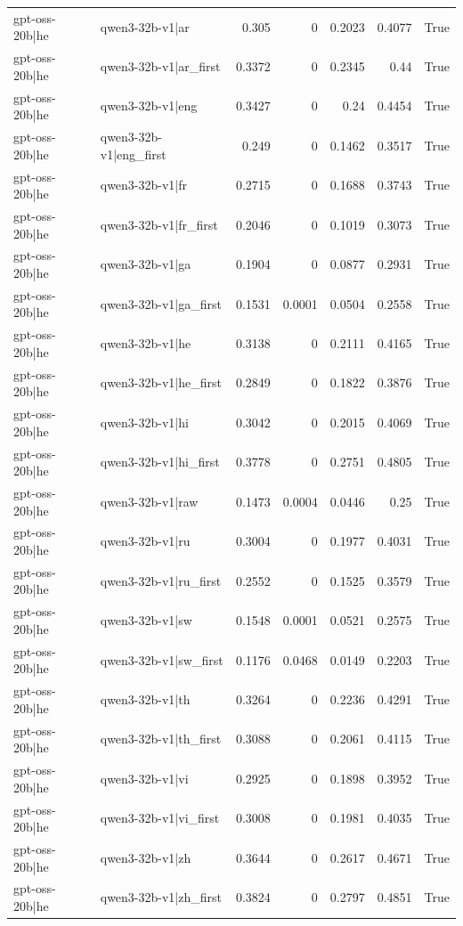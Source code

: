 \begin{table}
\begin{tabular}{l l r r r r l}
gpt-oss-20b|he & qwen3-32b-v1|ar & 0.305 & 0 & 0.2023 & 0.4077 & True \\
gpt-oss-20b|he & qwen3-32b-v1|ar_first & 0.3372 & 0 & 0.2345 & 0.44 & True \\
gpt-oss-20b|he & qwen3-32b-v1|eng & 0.3427 & 0 & 0.24 & 0.4454 & True \\
gpt-oss-20b|he & qwen3-32b-v1|eng_first & 0.249 & 0 & 0.1462 & 0.3517 & True \\
gpt-oss-20b|he & qwen3-32b-v1|fr & 0.2715 & 0 & 0.1688 & 0.3743 & True \\
gpt-oss-20b|he & qwen3-32b-v1|fr_first & 0.2046 & 0 & 0.1019 & 0.3073 & True \\
gpt-oss-20b|he & qwen3-32b-v1|ga & 0.1904 & 0 & 0.0877 & 0.2931 & True \\
gpt-oss-20b|he & qwen3-32b-v1|ga_first & 0.1531 & 0.0001 & 0.0504 & 0.2558 & True \\
gpt-oss-20b|he & qwen3-32b-v1|he & 0.3138 & 0 & 0.2111 & 0.4165 & True \\
gpt-oss-20b|he & qwen3-32b-v1|he_first & 0.2849 & 0 & 0.1822 & 0.3876 & True \\
gpt-oss-20b|he & qwen3-32b-v1|hi & 0.3042 & 0 & 0.2015 & 0.4069 & True \\
gpt-oss-20b|he & qwen3-32b-v1|hi_first & 0.3778 & 0 & 0.2751 & 0.4805 & True \\
gpt-oss-20b|he & qwen3-32b-v1|raw & 0.1473 & 0.0004 & 0.0446 & 0.25 & True \\
gpt-oss-20b|he & qwen3-32b-v1|ru & 0.3004 & 0 & 0.1977 & 0.4031 & True \\
gpt-oss-20b|he & qwen3-32b-v1|ru_first & 0.2552 & 0 & 0.1525 & 0.3579 & True \\
gpt-oss-20b|he & qwen3-32b-v1|sw & 0.1548 & 0.0001 & 0.0521 & 0.2575 & True \\
gpt-oss-20b|he & qwen3-32b-v1|sw_first & 0.1176 & 0.0468 & 0.0149 & 0.2203 & True \\
gpt-oss-20b|he & qwen3-32b-v1|th & 0.3264 & 0 & 0.2236 & 0.4291 & True \\
gpt-oss-20b|he & qwen3-32b-v1|th_first & 0.3088 & 0 & 0.2061 & 0.4115 & True \\
gpt-oss-20b|he & qwen3-32b-v1|vi & 0.2925 & 0 & 0.1898 & 0.3952 & True \\
gpt-oss-20b|he & qwen3-32b-v1|vi_first & 0.3008 & 0 & 0.1981 & 0.4035 & True \\
gpt-oss-20b|he & qwen3-32b-v1|zh & 0.3644 & 0 & 0.2617 & 0.4671 & True \\
gpt-oss-20b|he & qwen3-32b-v1|zh_first & 0.3824 & 0 & 0.2797 & 0.4851 & True \\

\end{tabular}
\end{table}
